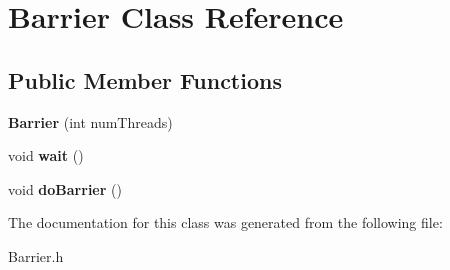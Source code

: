 \hypertarget{classBarrier}{}\section{Barrier Class Reference}
\label{classBarrier}
\subsection*{Public Member Functions}
\begin{DoxyCompactItemize}
\item 
\mbox{\label{classBarrier_a7290fb8952d0f7779b8d6a7a34bbd407}} 
{\bfseries Barrier} (int num\+Threads)
\item 
\mbox{\label{classBarrier_a83a9d2e85e98b3d2081538bf0da29b60}} 
void {\bfseries wait} ()
\item 
\mbox{\label{classBarrier_a9f9c0ff79b77fbf310d9115d6207a85c}} 
void {\bfseries do\+Barrier} ()
\end{DoxyCompactItemize}


The documentation for this class was generated from the following file\+:\begin{DoxyCompactItemize}
\item 
Barrier.\+h\end{DoxyCompactItemize}

